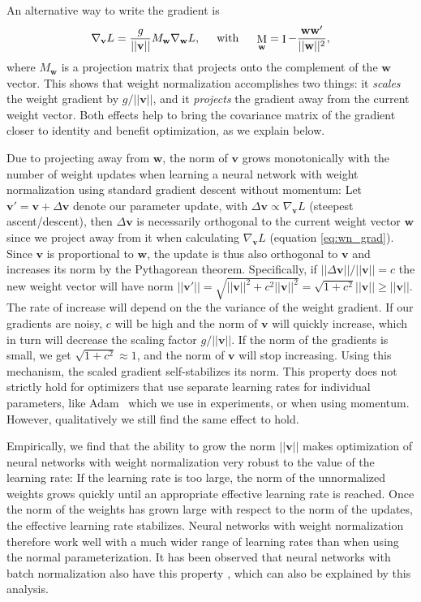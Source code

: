 \documentclass{article}
\DeclareMathOperator{\M}{M}
\DeclareMathOperator{\Id}{I}
\newcommand{\bv}{\mathbf{v}}
\newcommand{\bw}{\mathbf{w}}
\begin{document}
An alternative way to write the gradient is
\begin{equation}
\nabla_{\bv}L = \frac{g}{||\bv||} M_{\bw} \nabla_{\bw}L, \hspace{0.5cm} \text{with} \hspace{0.5cm} \M_{\bw} = \Id - \frac{\bw\bw'}{||\bw||^{2}}, \label{eq:wn_grad}
\end{equation}
where $M_{\bw}$ is a projection matrix that projects onto the complement of the $\bw$ vector. This shows that weight normalization accomplishes two things: it \emph{scales} the weight gradient by $g/||\bv||$, and it \emph{projects} the gradient away from the current weight vector. Both effects help to bring the covariance matrix of the gradient closer to identity and benefit optimization, as we explain below.

Due to projecting away from $\bw$, the norm of $\bv$ grows monotonically with the number of weight updates when learning a neural network with weight normalization using standard gradient descent without momentum: Let $\bv' = \bv + \Delta\bv$ denote our parameter update, with $\Delta\bv \propto \nabla_{\bv}L$ (steepest ascent/descent), then $\Delta\bv$ is necessarily orthogonal to the current weight vector $\bw$ since we project away from it when calculating $\nabla_{\bv}L$ (equation \ref{eq:wn_grad}). Since $\bv$ is proportional to $\bw$, the update is thus also orthogonal to $\bv$ and increases its norm by the Pythagorean theorem. Specifically, if $||\Delta\bv||/||\bv|| = c$ the new weight vector will have norm $||\bv'|| = \sqrt{||\bv||^2 + c^2 ||\bv||^2} = \sqrt{1 + c^2}||\bv|| \geq ||\bv||$. The rate of increase will depend on the the variance of the weight gradient. If our gradients are noisy, $c$ will be high and the norm of $\bv$ will quickly increase, which in turn will decrease the scaling factor $g/||\bv||$. If the norm of the gradients is small, we get $\sqrt{1 + c^2} \approx 1$, and the norm of $\bv$ will stop increasing. Using this mechanism, the scaled gradient self-stabilizes its norm. This property does not strictly hold for optimizers that use separate learning rates for individual parameters, like Adam~\cite{kingma2014adam} which we use in experiments, or when using momentum. However, qualitatively we still find the same effect to hold.

Empirically, we find that the ability to grow the norm $||\bv||$ makes optimization of neural networks with weight normalization very robust to the value of the learning rate: If the learning rate is too large, the norm of the unnormalized weights grows quickly until an appropriate effective learning rate is reached. Once the norm of the weights has grown large with respect to the norm of the updates, the effective learning rate stabilizes. Neural networks with weight normalization therefore work well with a much wider range of learning rates than when using the normal parameterization. It has been observed that neural networks with batch normalization also have this property \cite{ioffe2015batch}, which can also be explained by this analysis.
\end{document}
